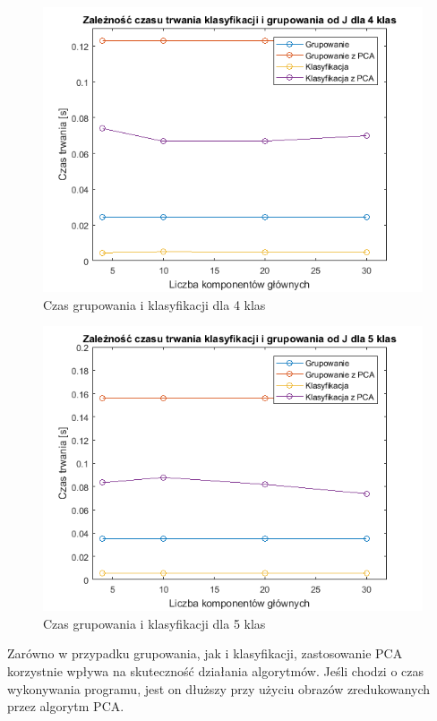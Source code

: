 \begin{figure}[H]
	\centering
	\includegraphics{img/time_from_J_4classes.png}
	\caption{Czas grupowania i klasyfikacji dla 4 klas}  
	\label{rys:time_from_J_42classes} 
\end{figure}

\begin{figure}[H]
	\centering
	\includegraphics{img/time_from_J_5classes.png}
	\caption{Czas grupowania i klasyfikacji dla 5 klas}  
	\label{rys:time_from_J_5classes} 
\end{figure}


Zarówno w przypadku grupowania, jak i klasyfikacji, zastosowanie PCA korzystnie wpływa na skuteczność działania algorytmów. Jeśli chodzi o czas wykonywania programu, jest on dłuższy przy użyciu obrazów zredukowanych przez algorytm PCA.